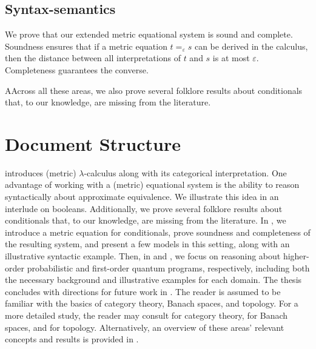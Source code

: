 \subsection*{Syntax-semantics}
We prove that our extended metric equational system is sound and complete. Soundness ensures that if a metric equation $t =_{\varepsilon} s$ can be derived in the calculus, then the distance between all interpretations of $t$ and $s$ is at most $\varepsilon$. Completeness guarantees the converse.

\vspace{10pt}
AAcross all these areas, we also prove several folklore results about conditionals that, to our knowledge, are missing from the literature.




\section{Document Structure}

 introduces (metric) $\lambda$-calculus along with its categorical interpretation. One advantage of working with a (metric) equational system is the ability to reason syntactically about approximate equivalence. We illustrate this idea in an interlude on booleans. Additionally, we prove several folklore results about conditionals that, to our knowledge, are missing from the literature.
 In , we introduce a metric equation for conditionals, prove soundness and completeness of the resulting system, and present a few models in this setting, along with an illustrative syntactic example. 
 Then, in  and , we focus on reasoning about higher-order probabilistic and first-order quantum programs, respectively, including both the necessary background and illustrative examples for each domain.
 The thesis concludes with directions for future work in . 
The reader is assumed to be familiar with the basics of category theory, Banach spaces, and topology. For a more detailed study, the reader may consult \cite{awodeyCategoryTheory2010} for category theory, \cite[Chapters~1--2]{kreyszigIntroductoryFunctionalAnalysis2007} for Banach spaces, and \cite[Chapters~2~and~5]{guide2006infinite} for topology. Alternatively, an overview of these areas' relevant concepts and results is provided in .




